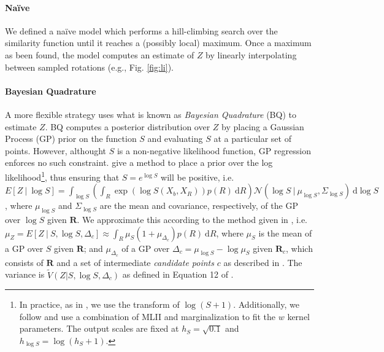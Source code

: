 \documentclass{article} %
\newcommand{\naive}[0]{na\"ive}
\newcommand{\Naive}[0]{Na\"ive}
\begin{document}
\paragraph{\Naive{}}

We defined a \naive{} model which performs a hill-climbing search over
the similarity function until it reaches a (possibly local)
maximum. Once a maximum as been found, the model computes an estimate
of $Z$ by linearly interpolating between sampled rotations (e.g.,
Fig. \ref{fig:li}).

\paragraph{Bayesian Quadrature}

A more flexible strategy uses what is known as \emph{Bayesian
  Quadrature} (BQ) \cite{Diaconis:1988uo,OHagan:1991tx} to estimate
$Z$.  BQ computes a posterior distribution over $Z$ by placing a
Gaussian Process (GP) prior on the function $S$ and evaluating $S$ at
a particular set of points. However, althought $S$ is a non-negative
likelihood function, GP regression enforces no such
constraint. \cite{Osborne:2012tm} give a method to place a prior over
the log likelihood\footnote{In practice, as in \cite{Osborne:2012tm},
  we use the transform of $\log(S+1)$. Additionally, we follow
  \cite{Osborne:2012tm} and use a combination of MLII and
  marginalization to fit the $w$ kernel parameters. The output scales
  are fixed at $h_S=\sqrt{0.1}$ and $h_{\log S}=\log(h_S + 1)$.}, thus
ensuring that $S=e^{\log S}$ will be positive, i.e.  $E[Z\ \vert \
\log S]=\int_{\log S}\left(\int_R \exp(\log{S(X_b,X_R)})p(R)\
  \mathrm{d}R\right)\mathcal{N}\left(\log{S}\ \vert \ \mu_{\log S},
  \Sigma_{\log S}\right)\ \mathrm{d}\log S$, where $\mu_{\log S}$ and
$\Sigma_{\log S}$ are the mean and covariance, respectively, of the GP
over $\log S$ given $\mathbf{R}$. We approximate this according to the
method given in \cite{Osborne:2012tm}, i.e. $\mu_Z=E[Z\ \vert \ S,
\log S, \Delta_c] \approx \int_R \mu_{S}(1 + \mu_{\Delta_c}) p(R)\
\mathrm{d}R$, where $\mu_S$ is the mean of a GP over $S$ given
$\mathbf{R}$; and $\mu_{\Delta_c}$ of a GP over $\Delta_c=\mu_{\log S}
- \log \mu_S$ given $\mathbf{R}_c$, which consists of $\mathbf{R}$ and
a set of intermediate \emph{candidate points} $c$ as described in
\cite{Osborne:2012tm}. The variance is $\tilde{V}(Z\vert S, \log S,
\Delta_c)$ as defined in Equation 12 of \cite{Osborne:2012tm}.
\end{document}

